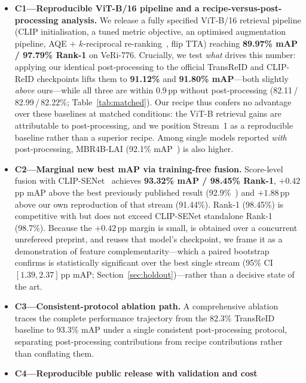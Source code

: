 \documentclass[10pt,a4paper]{article}
\begin{document}
\begin{itemize}
  \item \textbf{C1---Reproducible ViT-B/16 pipeline and a
    recipe-versus-post-processing analysis.} We release a fully specified
    ViT-B/16 retrieval pipeline (CLIP initialisation, a tuned metric objective,
    an optimised augmentation pipeline, AQE $+$ $k$-reciprocal
    re-ranking~\cite{zhong2017rerank}, flip TTA) reaching \textbf{89.97\% mAP /
    97.79\% Rank-1} on VeRi-776. Crucially, we test \emph{what} drives this
    number: applying our identical post-processing to the official TransReID
    and CLIP-ReID checkpoints lifts them to \textbf{91.12\%} and
    \textbf{91.80\% mAP}---both slightly \emph{above} ours---while all three
    are within 0.9\,pp without post-processing
    (82.11\,/\,82.99\,/\,82.22\%; Table~\ref{tab:matched}). Our recipe thus
    confers no advantage over these baselines at matched conditions: the ViT-B
    retrieval gains are attributable to post-processing, and we position
    Stream~1 as a reproducible baseline rather than a superior recipe. Among
    single models reported \emph{with} post-processing, MBR4B-LAI
    (92.1\% mAP~\cite{luo2023mbr4b}) is also higher.
  \item \textbf{C2---Marginal new best mAP via training-free fusion.}
    Score-level fusion with CLIP-SENet~\cite{lu2025clipsenet} achieves
    \textbf{93.32\% mAP / 98.45\% Rank-1}, $+0.42$\,pp mAP above the best
    previously published result (92.9\%~\cite{lu2025clipsenet}) and
    $+1.88$\,pp above our own reproduction of that stream (91.44\%). Rank-1
    (98.45\%) is competitive with but does not exceed CLIP-SENet standalone
    Rank-1 (98.7\%). Because the $+0.42$\,pp margin is small, is obtained over
    a concurrent unrefereed preprint, and reuses that model's checkpoint, we
    frame it as a demonstration of feature complementarity---which a paired
    bootstrap confirms is statistically significant over the best single
    stream (95\% CI $[1.39, 2.37]$\,pp mAP; Section~\ref{sec:holdout})---rather
    than a decisive state of the art.
  \item \textbf{C3---Consistent-protocol ablation path.} A comprehensive
    ablation traces the complete performance trajectory from the 82.3\%
    TransReID baseline to 93.3\% mAP under a single consistent post-processing
    protocol, separating post-processing contributions from recipe
    contributions rather than conflating them.
  \item \textbf{C4---Reproducible public release with validation and cost
}
\end{itemize}
\end{document}
